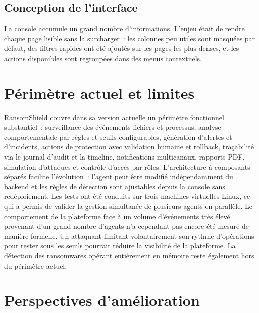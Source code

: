 \subsection{Conception de l'interface}

La console accumule un grand nombre d'informations. L'enjeu était de rendre chaque page lisible sans la surcharger~: les colonnes peu utiles sont masquées par défaut, des filtres rapides ont été ajoutés sur les pages les plus denses, et les actions disponibles sont regroupées dans des menus contextuels.

\section{Périmètre actuel et limites}

RansomShield couvre dans sa version actuelle un périmètre fonctionnel substantiel~: surveillance des événements fichiers et processus, analyse comportementale par règles et seuils configurables, génération d'alertes et d'incidents, actions de protection avec validation humaine et rollback, traçabilité via le journal d'audit et la timeline, notifications multicanaux, rapports PDF, simulation d'attaques et contrôle d'accès par rôles. L'architecture à composants séparés facilite l'évolution~: l'agent peut être modifié indépendamment du backend et les règles de détection sont ajustables depuis la console sans redéploiement. Les tests ont été conduits sur trois machines virtuelles Linux, ce qui a permis de valider la gestion simultanée de plusieurs agents en parallèle. Le comportement de la plateforme face à un volume d'événements très élevé provenant d'un grand nombre d'agents n'a cependant pas encore été mesuré de manière formelle. Un attaquant limitant volontairement son rythme d'opérations pour rester sous les seuils pourrait réduire la visibilité de la plateforme. La détection des ransomwares opérant entièrement en mémoire reste également hors du périmètre actuel.

\section{Perspectives d'amélioration}


